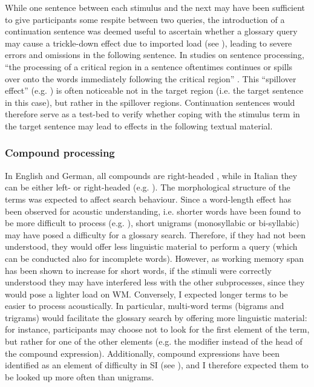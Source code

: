While one sentence between each stimulus and the next may have been sufficient to give participants some respite between two queries, the introduction of a continuation sentence was deemed useful to ascertain whether a glossary query may cause a trickle-down effect due to imported load (see \citealt{gile_local_2008}), leading to severe errors and omissions in the following sentence. In studies on sentence processing, ``the processing of a critical region in a sentence oftentimes continues or spills over onto the words immediately following the critical region'' \citep[6]{keating_experimental_2015}. This ``spillover effect'' (e.g. \citealt{rayner_lexical_1986}) is often noticeable not in the target region (i.e. the target sentence in this case), but rather in the spillover regions. Continuation sentences would therefore serve as a test-bed to verify whether coping with the stimulus term in the target sentence may lead to effects in the following textual material.



\subsubsection{Compound processing} \label{compounds}
In English and German, all compounds are right-headed \citep{arcara_word_2014,semenza_combining_2014}, while in Italian they can be either left- or right-headed (e.g. \citealt{ghiselli_sfide_2015}). The morphological structure of the terms was expected to affect search behaviour. Since a word-length effect has been observed for acoustic understanding, i.e. shorter words have been found to be more difficult to process (e.g. \citealt{barton_word-length_2014}), short unigrams (monosyllabic or bi-syllabic) may have posed a difficulty for a glossary search. Therefore, if they had not been understood, they would offer less linguistic material to perform a query (which can be conducted also for incomplete words). However, as working memory span has been shown to increase for short words, if the stimuli were correctly understood they may have interfered less with the other subprocesses, since they would pose a lighter load on WM. Conversely, I expected longer terms to be easier to process acoustically. In particular, multi-word terms (bigrams and trigrams) would facilitate the glossary search by offering more linguistic material: for instance, participants may choose not to look for the first element of the term, but rather for one of the other elements (e.g. the modifier instead of the head of the compound expression). Additionally, compound expressions have been identified as an element of difficulty in SI (see \citealt{ghiselli_sfide_2015}), and I therefore expected them to be looked up more often than unigrams.



